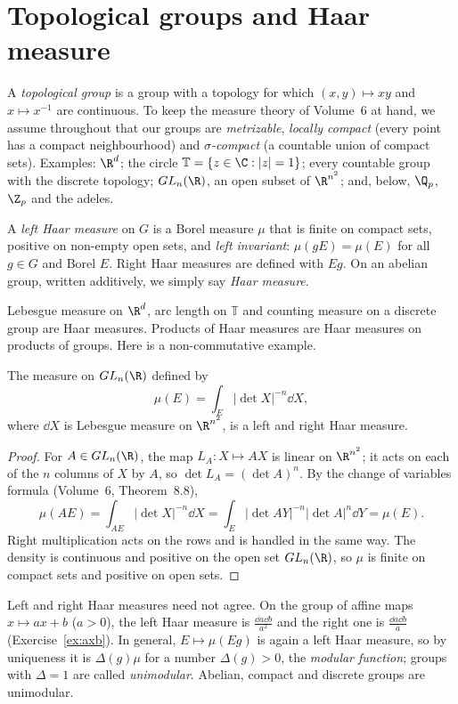 \section{Topological groups and Haar measure}

A \emph{topological group} is a group with a topology for which $(x,y)\mapsto xy$ and $x\mapsto x^{-1}$ are continuous. To keep the measure theory
of Volume~6 at hand, we assume throughout that our groups are \emph{metrizable}, \emph{locally compact} (every point has a compact neighbourhood) and
\emph{$\sigma$-compact} (a countable union of compact sets). Examples: $\R^d$; the circle $\mathbb T=\{z\in\C:|z|=1\}$; every countable group with the discrete
topology; $GL_n(\R)$, an open subset of $\R^{n^2}$; and, below, $\Q_p$, $\Z_p$ and the adeles.

\begin{definition}
A \emph{left Haar measure} on $G$ is a Borel measure $\mu$ that is finite on compact sets, positive on non-empty open sets, and \emph{left invariant}:
$\mu(gE)=\mu(E)$ for all $g\in G$ and Borel $E$. Right Haar measures are defined with $Eg$. On an abelian group, written additively, we simply
say \emph{Haar measure}.
\end{definition}

Lebesgue measure on $\R^d$, arc length on $\mathbb T$ and counting measure on a discrete group are Haar measures. Products of Haar measures are
Haar measures on products of groups. Here is a non-commutative example.

\begin{proposition}\label{prop:glnhaar}
The measure on $GL_n(\R)$ defined by
\[\mu(E)=\int_E|\det X|^{-n}\dd X,\]
where $\dd X$ is Lebesgue measure on $\R^{n^2}$, is a left and right Haar measure.
\end{proposition}
\begin{proof}
For $A\in GL_n(\R)$, the map $L_A:X\mapsto AX$ is linear on $\R^{n^2}$; it acts on each of the $n$ columns of $X$ by $A$, so $\det L_A=(\det A)^n$. By the change of
variables formula (Volume~6, Theorem~8.8),
\[\mu(AE)=\int_{AE}|\det X|^{-n}\dd X=\int_E|\det AY|^{-n}|\det A|^n\dd Y=\mu(E).\]
Right multiplication acts on the rows and is handled in the same way. The density is continuous and positive on the open set $GL_n(\R)$, so $\mu$ is
finite on compact sets and positive on open sets.
\end{proof}

Left and right Haar measures need not agree. On the group of affine maps $x\mapsto ax+b$ ($a>0$), the left Haar measure is $\frac{\dd a\dd b}{a^2}$ and the
right one is $\frac{\dd a\dd b}a$ (Exercise~\ref{ex:axb}). In general, $E\mapsto\mu(Eg)$ is again a left Haar measure, so by uniqueness it is $\Delta(g)\mu$ for a
number $\Delta(g)>0$, the \emph{modular function}; groups with $\Delta=1$ are called \emph{unimodular}. Abelian, compact and discrete groups are unimodular.

